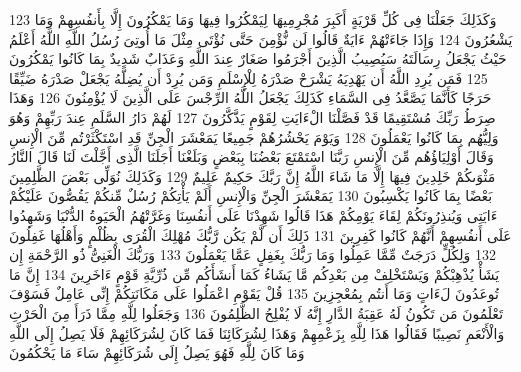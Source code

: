 \documentclass[20pt,a4paper]{article}
\begin{document}
{\tiny\colorbox{cl_aya}{123}} وَكَذَلِكَ جَعَلْنَا فِى كُلِّ قَرْيَةٍ أَكَبِرَ مُجْرِمِيهَا لِيَمْكُرُوا فِيهَا وَمَا يَمْكُرُونَ إِلَّا بِأَنفُسِهِمْ وَمَا يَشْعُرُونَ
{\tiny\colorbox{cl_aya}{124}} وَإِذَا جَاءَتْهُمْ ءَايَةٌ قَالُوا لَن نُّؤْمِنَ حَتَّى نُؤْتَى مِثْلَ مَا أُوتِىَ رُسُلُ اللَّهِ اللَّهُ أَعْلَمُ حَيْثُ يَجْعَلُ رِسَالَتَهُ سَيُصِيبُ الَّذِينَ أَجْرَمُوا صَغَارٌ عِندَ اللَّهِ وَعَذَابٌ شَدِيدٌ بِمَا كَانُوا يَمْكُرُونَ
{\tiny\colorbox{cl_aya}{125}} فَمَن يُرِدِ اللَّهُ أَن يَهْدِيَهُ يَشْرَحْ صَدْرَهُ لِلْإِسْلَمِ وَمَن يُرِدْ أَن يُضِلَّهُ يَجْعَلْ صَدْرَهُ ضَيِّقًا حَرَجًا كَأَنَّمَا يَصَّعَّدُ فِى السَّمَاءِ كَذَلِكَ يَجْعَلُ اللَّهُ الرِّجْسَ عَلَى الَّذِينَ لَا يُؤْمِنُونَ
{\tiny\colorbox{cl_aya}{126}} وَهَذَا صِرَطُ رَبِّكَ مُسْتَقِيمًا قَدْ فَصَّلْنَا الْءَايَتِ لِقَوْمٍ يَذَّكَّرُونَ
{\tiny\colorbox{cl_aya}{127}} لَهُمْ دَارُ السَّلَمِ عِندَ رَبِّهِمْ وَهُوَ وَلِيُّهُم بِمَا كَانُوا يَعْمَلُونَ
{\tiny\colorbox{cl_aya}{128}} وَيَوْمَ يَحْشُرُهُمْ جَمِيعًا يَمَعْشَرَ الْجِنِّ قَدِ اسْتَكْثَرْتُم مِّنَ الْإِنسِ وَقَالَ أَوْلِيَاؤُهُم مِّنَ الْإِنسِ رَبَّنَا اسْتَمْتَعَ بَعْضُنَا بِبَعْضٍ وَبَلَغْنَا أَجَلَنَا الَّذِى أَجَّلْتَ لَنَا قَالَ النَّارُ مَثْوَىكُمْ خَلِدِينَ فِيهَا إِلَّا مَا شَاءَ اللَّهُ إِنَّ رَبَّكَ حَكِيمٌ عَلِيمٌ
{\tiny\colorbox{cl_aya}{129}} وَكَذَلِكَ نُوَلِّى بَعْضَ الظَّلِمِينَ بَعْضًا بِمَا كَانُوا يَكْسِبُونَ
{\tiny\colorbox{cl_aya}{130}} يَمَعْشَرَ الْجِنِّ وَالْإِنسِ أَلَمْ يَأْتِكُمْ رُسُلٌ مِّنكُمْ يَقُصُّونَ عَلَيْكُمْ ءَايَتِى وَيُنذِرُونَكُمْ لِقَاءَ يَوْمِكُمْ هَذَا قَالُوا شَهِدْنَا عَلَى أَنفُسِنَا وَغَرَّتْهُمُ الْحَيَوةُ الدُّنْيَا وَشَهِدُوا عَلَى أَنفُسِهِمْ أَنَّهُمْ كَانُوا كَفِرِينَ
{\tiny\colorbox{cl_aya}{131}} ذَلِكَ أَن لَّمْ يَكُن رَّبُّكَ مُهْلِكَ الْقُرَى بِظُلْمٍ وَأَهْلُهَا غَفِلُونَ
{\tiny\colorbox{cl_aya}{132}} وَلِكُلٍّ دَرَجَتٌ مِّمَّا عَمِلُوا وَمَا رَبُّكَ بِغَفِلٍ عَمَّا يَعْمَلُونَ
{\tiny\colorbox{cl_aya}{133}} وَرَبُّكَ الْغَنِىُّ ذُو الرَّحْمَةِ إِن يَشَأْ يُذْهِبْكُمْ وَيَسْتَخْلِفْ مِن بَعْدِكُم مَّا يَشَاءُ كَمَا أَنشَأَكُم مِّن ذُرِّيَّةِ قَوْمٍ ءَاخَرِينَ
{\tiny\colorbox{cl_aya}{134}} إِنَّ مَا تُوعَدُونَ لَءَاتٍ وَمَا أَنتُم بِمُعْجِزِينَ
{\tiny\colorbox{cl_aya}{135}} قُلْ يَقَوْمِ اعْمَلُوا عَلَى مَكَانَتِكُمْ إِنِّى عَامِلٌ فَسَوْفَ تَعْلَمُونَ مَن تَكُونُ لَهُ عَقِبَةُ الدَّارِ إِنَّهُ لَا يُفْلِحُ الظَّلِمُونَ
{\tiny\colorbox{cl_aya}{136}} وَجَعَلُوا لِلَّهِ مِمَّا ذَرَأَ مِنَ الْحَرْثِ وَالْأَنْعَمِ نَصِيبًا فَقَالُوا هَذَا لِلَّهِ بِزَعْمِهِمْ وَهَذَا لِشُرَكَائِنَا فَمَا كَانَ لِشُرَكَائِهِمْ فَلَا يَصِلُ إِلَى اللَّهِ وَمَا كَانَ لِلَّهِ فَهُوَ يَصِلُ إِلَى شُرَكَائِهِمْ سَاءَ مَا يَحْكُمُونَ
\end{document}
